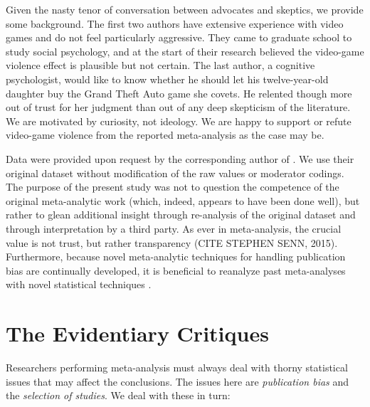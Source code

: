 \documentclass[man]{apa6}
\begin{document}
Given the nasty tenor of conversation between advocates and skeptics, we provide some background.  The first two authors have extensive experience with video games and do not feel particularly aggressive.  They came to graduate school to study social psychology, and at the start of their research believed the video-game violence effect is plausible but not certain.   The last author, a cognitive psychologist, would like to know whether he should let his twelve-year-old daughter buy the Grand Theft Auto game she covets.  He relented though more out of trust for her judgment than out of any deep skepticism of the literature. We are motivated by curiosity, not ideology.  We are happy to support or refute video-game violence from the reported meta-analysis as the case may be.

Data were provided upon request by the corresponding author of \citet{Anderson:etal:2010}. We use their original dataset without modification of the raw values or moderator codings. The purpose of the present study was not to question the competence of the original meta-analytic work (which, indeed, appears to have been done well), but rather to glean additional insight through re-analysis of the original dataset and through interpretation by a third party. As ever in meta-analysis, the crucial value is not trust, but rather transparency (CITE STEPHEN SENN, 2015). Furthermore, because novel meta-analytic techniques for handling publication bias are continually developed, it is beneficial to reanalyze past meta-analyses with novel statistical techniques \citep{Lakens:etal:2015}.

\section{The Evidentiary Critiques}

Researchers performing meta-analysis must always deal with thorny statistical issues that may affect the conclusions.  The issues here are {\em publication bias} and the {\em selection of studies}.  We deal with these in turn:
\end{document}
